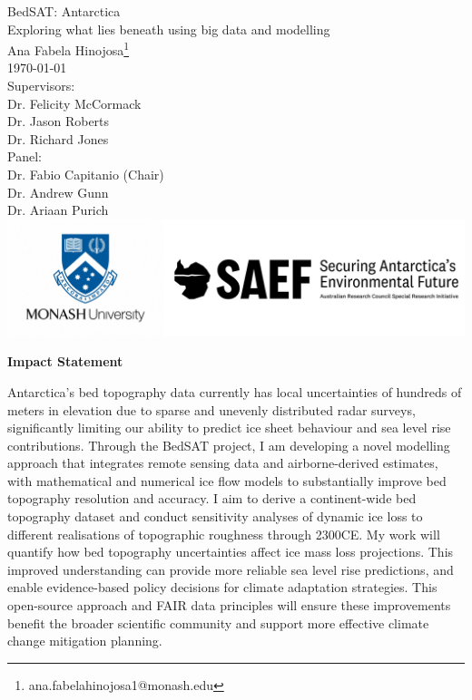 \documentclass[12pt, a4paper, openany]{book}
\newenvironment{impactstatement}
{\clearpage \thispagestyle{empty} \null \vfill \begin{center} \bfseries \large Impact Statement \end{center}}
{\vfill \null \clearpage}
\begin{document}
\begin{titlepage}
\begin{center}
    {\Huge BedSAT: Antarctica}\\ [1cm] 
    {\Large Exploring what lies beneath using big data and modelling}\\
    \vspace{5cm}
    {\large Ana Fabela Hinojosa\footnote{ana.fabelahinojosa1@monash.edu}}\\
    \monthyeardate\today\\ [1cm]
    Supervisors:\\
    Dr. Felicity McCormack\\
    Dr. Jason Roberts\\
    Dr. Richard Jones\\ [2cm]
    Panel:\\
    Dr. Fabio Capitanio (Chair) \\
    Dr. Andrew Gunn \\
    Dr. Ariaan Purich \\ [3.5cm]
    \includegraphics[scale=0.2]{logos.png}

    \end{center}

\end{titlepage}

\begin{impactstatement}\label{impactstatement}
Antarctica's bed topography data currently has local uncertainties of hundreds of meters in elevation due to sparse and unevenly distributed radar surveys, significantly limiting our ability to predict ice sheet behaviour and sea level rise contributions. Through the BedSAT project, I am developing a novel modelling approach that integrates remote sensing data and airborne-derived estimates, with mathematical and numerical ice flow models to substantially improve bed topography resolution and accuracy. I aim to derive a continent-wide bed topography dataset and conduct sensitivity analyses of dynamic ice loss to different realisations of topographic roughness through 2300CE.
My work will quantify how bed topography uncertainties affect ice mass loss projections. This improved understanding can provide more reliable sea level rise predictions, and enable evidence-based policy decisions for climate adaptation strategies. This open-source approach and FAIR data principles will ensure these improvements benefit the broader scientific community and support more effective climate change mitigation planning.
\end{impactstatement}
\end{document}
